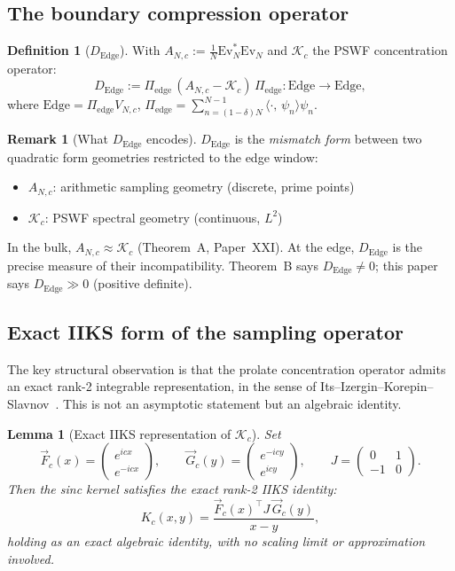 \documentclass[12pt,a4paper]{amsart}
\newtheorem{lemma}[theorem]{Lemma}
\theoremstyle{definition}
\newtheorem{definition}[theorem]{Definition}
\newtheorem{remark}[theorem]{Remark}
\newcommand{\Kop}{\mathcal{K}_c}
\newcommand{\Pedge}{\Pi_{\mathrm{edge}}}
\newcommand{\Ev}{\mathrm{Ev}_N}
\newcommand{\AN}{A_{N,c}}
\newcommand{\Dedge}{D_{\mathrm{Edge}}}
\newcommand{\ip}[2]{\langle #1,\, #2\rangle}
\newcommand{\Fvec}{\vec{F}_c}
\newcommand{\Gvec}{\vec{G}_c}
\begin{document}
\subsection{The boundary compression operator}

\begin{definition}[$\Dedge$]\label{def:dedge}
With $\AN := \frac{1}{N}\Ev^*\Ev$ and $\Kop$ the
PSWF concentration operator:
\[
  \Dedge
  := \Pedge\,(\AN - \Kop)\,\Pedge
  : \mathrm{Edge} \to \mathrm{Edge},
\]
where $\mathrm{Edge} = \Pedge V_{N,c}$,
$\Pedge = \sum_{n=(1-\delta)N}^{N-1}\ip{\cdot}{\psi_n}\psi_n$.
\end{definition}

\begin{remark}[What $\Dedge$ encodes]
$\Dedge$ is the \emph{mismatch form} between two
quadratic form geometries restricted to the edge window:
\begin{itemize}
  \item $\AN$: arithmetic sampling geometry (discrete, prime points)
  \item $\Kop$: PSWF spectral geometry (continuous, $L^2$)
\end{itemize}
In the bulk, $\AN \approx \Kop$ (Theorem~A, Paper~XXI).
At the edge, $\Dedge$ is the precise measure of their
incompatibility. Theorem~B says $\Dedge \ne 0$;
this paper says $\Dedge \gg 0$ (positive definite).
\end{remark}

\subsection{Exact IIKS form of the sampling operator}

The key structural observation is that the prolate concentration
operator admits an exact rank-2 integrable representation,
in the sense of Its--Izergin--Korepin--Slavnov~\cite{ItsIzergin1990}.
This is not an asymptotic statement but an algebraic identity.

\begin{lemma}[Exact IIKS representation of $\Kop$]\label{lem:iiks}
Set
\[
  \Fvec(x)
  = \begin{pmatrix}e^{icx}\\e^{-icx}\end{pmatrix},
  \qquad
  \Gvec(y)
  = \begin{pmatrix}e^{-icy}\\e^{icy}\end{pmatrix},
  \qquad
  J = \begin{pmatrix}0&1\\-1&0\end{pmatrix}.
\]
Then the sinc kernel satisfies the exact rank-2 IIKS identity:
\begin{equation}\label{eq:iiks}
  K_c(x,y)
  = \frac{\Fvec(x)^\top J\,\Gvec(y)}{x-y},
\end{equation}
holding as an exact algebraic identity, with no scaling limit
or approximation involved.
\end{lemma}
\end{document}
